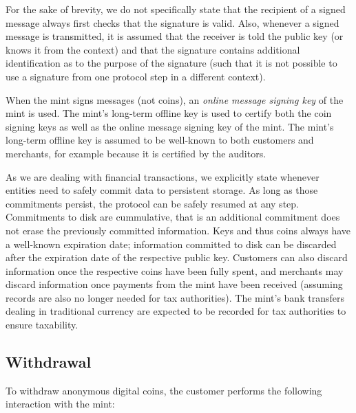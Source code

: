 \documentclass{llncs}
\begin{document}
For the sake of brevity, we do not specifically state that the
recipient of a signed message always first checks that the signature
is valid.  Also, whenever a signed message is transmitted, it is
assumed that the receiver is told the public key (or knows it from the
context) and that the signature contains additional identification as
to the purpose of the signature (such that it is not possible to
use a signature from one protocol step in a different context).

When the mint signs messages (not coins), an {\em online message
  signing key} of the mint is used.  The mint's long-term offline key
is used to certify both the coin signing keys as well as the online
message signing key of the mint.  The mint's long-term offline key is
assumed to be well-known to both customers and merchants, for example
because it is certified by the auditors.

As we are dealing with financial transactions, we explicitly state
whenever entities need to safely commit data to persistent storage.
As long as those commitments persist, the protocol can be safely
resumed at any step.  Commitments to disk are cummulative, that is an
additional commitment does not erase the previously committed
information.  Keys and thus coins always have a well-known expiration
date; information committed to disk can be discarded after the
expiration date of the respective public key.  Customers can also
discard information once the respective coins have been fully spent,
and merchants may discard information once payments from the mint have
been received (assuming records are also no longer needed for tax
authorities).  The mint's bank transfers dealing in traditional
currency are expected to be recorded for tax authorities to ensure
taxability.

\subsection{Withdrawal}

To withdraw anonymous digital coins, the customer performs the
following interaction with the mint:
\end{document}
